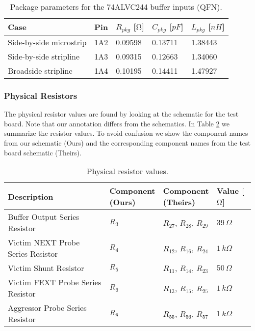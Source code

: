 \documentclass[../main.tex]{subfiles}
\begin{document}
\begin{table}[h]
    \centering
    \begin{tabular}{l|l l l l}
        \toprule[1pt]
        \textbf{Case} & \textbf{Pin} & $R_{pkg}$ [$\si{\ohm}$] & $C_{pkg}$ [$\si{pF}$] & $L_{pkg}$ [$\si{nH}$] \\
        \midrule
        Side-by-side microstrip & 1A2 & 0.09598 & 0.13711 & 1.38443 \\
        Side-by-side stripline  & 1A3 & 0.09315 & 0.12663 & 1.34060 \\
        Broadside stripline     & 1A4 & 0.10195 & 0.14411 & 1.47927 \\
        \bottomrule[1pt]
    \end{tabular}
    \caption{Package parameters for the 74ALVC244 buffer inputs (QFN).}
    \label{tab:pkg-params2}
\end{table}

\subsubsection{Physical Resistors}

The physical resistor values are found by looking at the schematic for the test board. Note that our annotation differs from the schematics. In Table \ref{tab:resistor-params} we summarize the resistor values. To avoid confusion we show the component names from our schematic (Ours) and the corresponding component names from the test board schematic (Theirs).

\begin{table}[h]
    \centering
    \begin{tabular}{l|l l l}
        \toprule[1pt]
        \textbf{Description} &
        \makecell[l]{\textbf{Component} \\ \textbf{(Ours)}} & 
        \makecell[l]{\textbf{Component} \\ \textbf{(Theirs)}} &  
        \textbf{Value [$\si{\ohm}$]} \\
        \midrule
        Buffer Output Series Resistor &
        $R_3$ & $R_{27}$, $R_{28}$, $R_{29}$ & $39\,\si{\Omega}$  \\
        Victim NEXT Probe Series Resistor &
        $R_4$ & $R_{12}$, $R_{16}$, $R_{24}$ & $1\,\si{k\Omega}$  \\
        Victim Shunt Resistor &
        $R_5$ & $R_{11}$, $R_{14}$, $R_{23}$ & $50\,\si{\Omega}$  \\
        Victim FEXT Probe Series Resistor &
        $R_6$ & $R_{13}$, $R_{15}$, $R_{25}$ & $1\,\si{k\Omega}$  \\
        Aggressor Probe Series Resistor &
        $R_8$ & $R_{55}$, $R_{56}$, $R_{57}$ & $1\,\si{k\Omega}$  \\
        \bottomrule[1pt]
    \end{tabular}
    \caption{Physical resistor values.}
    \label{tab:resistor-params}
\end{table}
\end{document}
